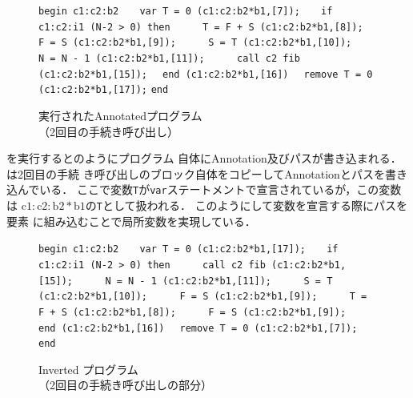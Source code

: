 \documentclass[submit,PRO]{ipsj}
\newcommand{\blabel}[1]{\mathrm{b}#1}
\newcommand{\clabel}[1]{\mathrm{c}#1}
\def\|{\verb|}
\begin{document}
\begin{figure}[tb]
\vbox{
\hbox{\|begin c1:c2:b2|}
\hbox{\|   var T = 0 (c1:c2:b2*b1,[7]);|}
\hbox{\|   if c1:c2:i1 (N-2 > 0) then|}
\hbox{\|     T = F + S (c1:c2:b2*b1,[8]);|}
\hbox{\|     F = S (c1:c2:b2*b1,[9]);|}
\hbox{\|     S = T (c1:c2:b2*b1,[10]);|}
\hbox{\|     N = N - 1 (c1:c2:b2*b1,[11]);|}
\hbox{\|     call c2 fib (c1:c2:b2*b1,[15]);|}
\hbox{\|  end (c1:c2:b2*b1,[16])|}
\hbox{\|  remove T = 0 (c1:c2:b2*b1,[17]);|}
\hbox{\|end|}
}
\centerline{}
\caption{実行されたAnnotatedプログラム\\
（2回目の手続き呼び出し）}
\label{fig:Hexec}
\end{figure}

を実行するとのようにプログラム
自体にAnnotation及びパスが書き込まれる．は2回目の手続
き呼び出しのブロック自体をコピーしてAnnotationとパスを書き込んでいる．
ここで変数\texttt{T}が\texttt{var}ステートメントで宣言されているが，この変数は
$\clabel{1}:\clabel{2}:\blabel{2}\ast\blabel{1}$の\texttt{T}として扱われる．
このようにして変数を宣言する際にパスを要素
に組み込むことで局所変数を実現している．

\begin{figure}[tb]
\vbox{
\hbox{\|begin c1:c2:b2|}
\hbox{\|   var T = 0 (c1:c2:b2*b1,[17]);|}
\hbox{\|   if c1:c2:i1 (N-2 > 0) then|}
\hbox{\|     call c2 fib (c1:c2:b2*b1,[15]);|}
\hbox{\|     N = N - 1 (c1:c2:b2*b1,[11]);|}
\hbox{\|     S = T (c1:c2:b2*b1,[10]);|}
\hbox{\|     F = S (c1:c2:b2*b1,[9]);|}
\hbox{\|     T = F + S (c1:c2:b2*b1,[8]);|}
\hbox{\|     F = S (c1:c2:b2*b1,[9]);|}
\hbox{\|  end (c1:c2:b2*b1,[16])|}
\hbox{\|  remove T = 0 (c1:c2:b2*b1,[7]);|}
\hbox{\|end|}
}
\centerline{}
\caption{Inverted プログラム\\
（2回目の手続き呼び出しの部分）}
\label{fig:Hinvprogram}
\end{figure}


\end{document}
